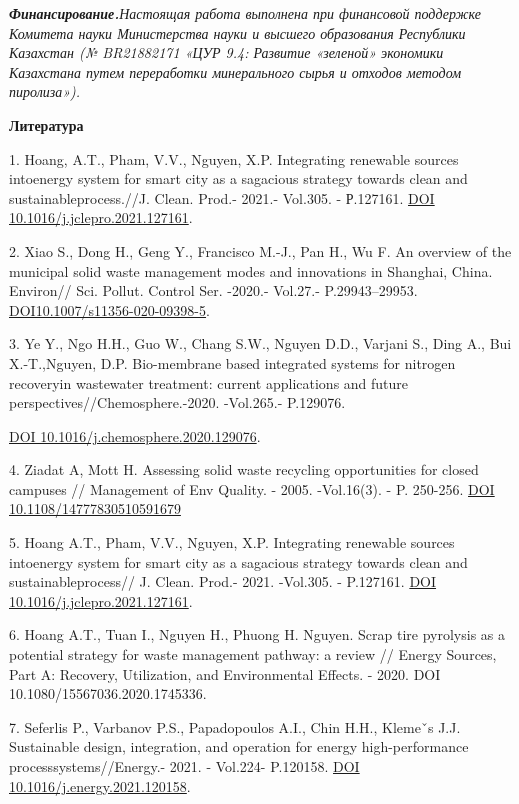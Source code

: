 \emph{{\bfseries Финансирование.}Настоящая работа выполнена при финансовой
поддержке Комитета науки Министерства науки и высшего образования
Республики Казахстан (№ BR21882171 «ЦУР 9.4: Развитие «зеленой»
экономики Казахстана путем переработки минерального сырья и отходов
методом пиролиза»).}

{\bfseries Литература}

1. Hoang, A.T., Pham, V.V., Nguyen, X.P. Integrating renewable sources
intoenergy system for smart city as a sagacious strategy towards clean
and sustainableprocess.//J. Clean. Prod.- 2021.- Vol.305. - Р.127161.
\href{https://doi.org/10.1016/j.jclepro.2021.127161}{DOI
10.1016/j.jclepro.2021.127161}.

2. Xiao S., Dong H., Geng Y., Francisco M.-J., Pan H., Wu F. An overview
of the municipal solid waste management modes and innovations in
Shanghai, China. Environ// Sci. Pollut. Control Ser. -2020.- Vol.27.-
P.29943--29953.
\href{https://doi.org/10.1007/s11356-020-09398-5}{DOI10.1007/s11356-020-09398-5}.

3. Ye Y., Ngo H.H., Guo W., Chang S.W., Nguyen D.D., Varjani S., Ding
A., Bui X.-T.,Nguyen, D.P. Bio-membrane based integrated systems for
nitrogen recoveryin wastewater treatment: current applications and
future perspectives//Chemosphere.-2020. -Vol.265.- P.129076.

\href{https://doi.org/10.1016/j.chemosphere.2020.129076}{DOI
10.1016/j.chemosphere.2020.129076}.

4. Ziadat A, Mott H. Assessing solid waste recycling opportunities for
closed campuses // Management of Env Quality. - 2005. -Vol.16(3). - P.
250-256. \href{https://doi.org/10.1108/14777830510591679}{DOI
10.1108/14777830510591679}

5. Hoang A.T., Pham, V.V., Nguyen, X.P. Integrating renewable sources
intoenergy system for smart city as a sagacious strategy towards clean
and sustainableprocess// J. Clean. Prod.- 2021. -Vol.305. - P.127161.
\href{https://doi.org/\%2010.1016/j.jclepro.2021.127161}{DOI
10.1016/j.jclepro.2021.127161}.

6. Hoang A.T., Tuan I., Nguyen H., Phuong H. Nguyen. Scrap tire
pyrolysis as a potential strategy for waste management pathway: a review
// Energy Sources, Part A: Recovery, Utilization, and Environmental
Effects. - 2020. DOI 10.1080/15567036.2020.1745336.

7. Seferlis P., Varbanov P.S., Papadopoulos A.I., Chin H.H., Klemeˇs
J.J. Sustainable design, integration, and operation for energy
high-performance processsystems//Energy.- 2021. - Vol.224- P.120158.
\href{https://doi.org/10.1016/j.energy.2021.120158}{DOI
10.1016/j.energy.2021.120158}.

